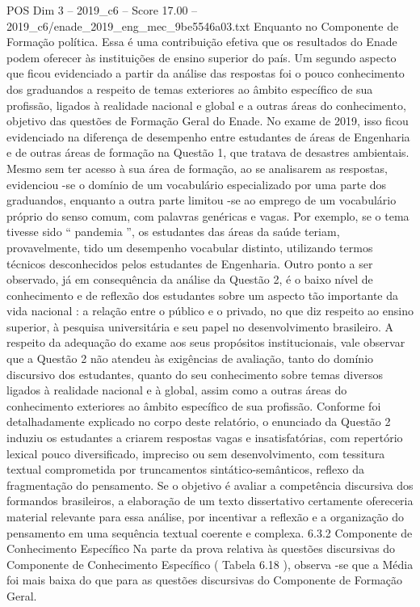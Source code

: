 \begin{textsample}{POS Dim 3 – 2019\_c6 – Score 17.00 – 2019\_c6/enade\_2019\_eng\_mec\_9be5546a03.txt}
Enquanto no Componente de Formação política.
Essa é uma contribuição efetiva que os resultados do Enade podem oferecer às instituições de ensino superior do país.
Um segundo aspecto que ficou evidenciado a partir da análise das respostas foi o pouco conhecimento dos graduandos a respeito de temas exteriores ao âmbito específico de sua profissão, ligados à realidade nacional e global e a outras áreas do conhecimento, objetivo das questões de Formação Geral do Enade.
No exame de 2019, isso ficou evidenciado na diferença de desempenho entre estudantes de áreas de Engenharia e de outras áreas de formação na Questão 1, que tratava de desastres ambientais.
Mesmo sem ter acesso à sua área de formação, ao se analisarem as respostas, evidenciou -se o domínio de um vocabulário especializado por uma parte dos graduandos, enquanto a outra parte limitou -se ao emprego de um vocabulário próprio do senso comum, com palavras genéricas e vagas.
Por exemplo, se o tema tivesse sido “ pandemia ”, os estudantes das áreas da saúde teriam, provavelmente, tido um desempenho vocabular distinto, utilizando termos técnicos desconhecidos pelos estudantes de Engenharia.
Outro ponto a ser observado, já em consequência da análise da Questão 2, é o baixo nível de conhecimento e de reflexão dos estudantes sobre um aspecto tão importante da vida nacional : a relação entre o público e o privado, no que diz respeito ao ensino superior, à pesquisa universitária e seu papel no desenvolvimento brasileiro.
A respeito da adequação do exame aos seus propósitos institucionais, vale observar que a Questão 2 não atendeu às exigências de avaliação, tanto do domínio discursivo dos estudantes, quanto do seu conhecimento sobre temas diversos ligados à realidade nacional e à global, assim como a outras áreas do conhecimento exteriores ao âmbito específico de sua profissão.
Conforme foi detalhadamente explicado no corpo deste relatório, o enunciado da Questão 2 induziu os estudantes a criarem respostas vagas e insatisfatórias, com repertório lexical pouco diversificado, impreciso ou sem desenvolvimento, com tessitura textual comprometida por truncamentos sintático-semânticos, reflexo da fragmentação do pensamento.
Se o objetivo é avaliar a competência discursiva dos formandos brasileiros, a elaboração de um texto dissertativo certamente ofereceria material relevante para essa análise, por incentivar a reflexão e a organização do pensamento em uma sequência textual coerente e complexa. 6.3.2 Componente de Conhecimento Específico Na parte da prova relativa às questões discursivas do Componente de Conhecimento Específico ( Tabela 6.18 ), observa -se que a Média foi mais baixa do que para as questões discursivas do Componente de Formação Geral.

\end{textsample}
